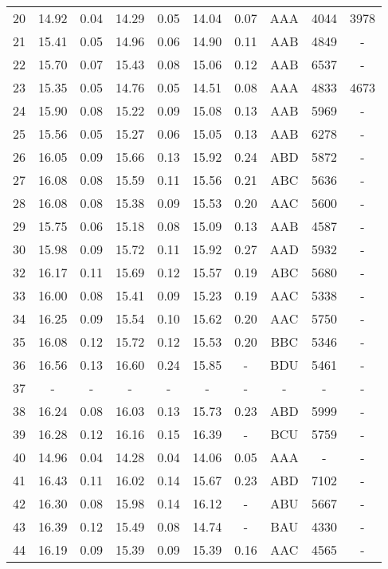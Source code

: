 \begin{longtable}{cccccccccc}
 20 & 14.92 & 0.04 & 14.29 & 0.05 & 14.04 & 0.07 & AAA & 4044 & 3978\\
\rowcolor[gray]{0.9}  21 & 15.41 & 0.05 & 14.96 & 0.06 & 14.90 & 0.11 & AAB & 4849 & -\\
\rowcolor[gray]{0.9}  22 & 15.70 & 0.07 & 15.43 & 0.08 & 15.06 & 0.12 & AAB & 6537 & -\\
\rowcolor[gray]{0.9}  23 & 15.35 & 0.05 & 14.76 & 0.05 & 14.51 & 0.08 & AAA & 4833 & 4673\\
 24 & 15.90 & 0.08 & 15.22 & 0.09 & 15.08 & 0.13 & AAB & 5969 & -\\
\rowcolor[gray]{0.9}  25 & 15.56 & 0.05 & 15.27 & 0.06 & 15.05 & 0.13 & AAB & 6278 & -\\
\rowcolor[gray]{0.9}  26 & 16.05 & 0.09 & 15.66 & 0.13 & 15.92 & 0.24 & ABD & 5872 & -\\
\rowcolor[gray]{0.9}  27 & 16.08 & 0.08 & 15.59 & 0.11 & 15.56 & 0.21 & ABC & 5636 & -\\
\rowcolor[gray]{0.9}  28 & 16.08 & 0.08 & 15.38 & 0.09 & 15.53 & 0.20 & AAC & 5600 & -\\
 29 & 15.75 & 0.06 & 15.18 & 0.08 & 15.09 & 0.13 & AAB & 4587 & -\\
 30 & 15.98 & 0.09 & 15.72 & 0.11 & 15.92 & 0.27 & AAD & 5932 & -\\
 32 & 16.17 & 0.11 & 15.69 & 0.12 & 15.57 & 0.19 & ABC & 5680 & -\\
 33 & 16.00 & 0.08 & 15.41 & 0.09 & 15.23 & 0.19 & AAC & 5338 & -\\
 34 & 16.25 & 0.09 & 15.54 & 0.10 & 15.62 & 0.20 & AAC & 5750 & -\\
 35 & 16.08 & 0.12 & 15.72 & 0.12 & 15.53 & 0.20 & BBC & 5346 & -\\
 36 & 16.56 & 0.13 & 16.60 & 0.24 & 15.85 & - & BDU & 5461 & -\\
 37 & - & - & - & - & - & - & - & - & -\\
 38 & 16.24 & 0.08 & 16.03 & 0.13 & 15.73 & 0.23 & ABD & 5999 & -\\
 39 & 16.28 & 0.12 & 16.16 & 0.15 & 16.39 & - & BCU & 5759 & -\\
 40 & 14.96 & 0.04 & 14.28 & 0.04 & 14.06 & 0.05 & AAA & - & -\\
 41 & 16.43 & 0.11 & 16.02 & 0.14 & 15.67 & 0.23 & ABD & 7102 & -\\
 42 & 16.30 & 0.08 & 15.98 & 0.14 & 16.12 & - & ABU & 5667 & -\\
 43 & 16.39 & 0.12 & 15.49 & 0.08 & 14.74 & - & BAU & 4330 & -\\
 44 & 16.19 & 0.09 & 15.39 & 0.09 & 15.39 & 0.16 & AAC & 4565 & -\\

\end{longtable}
